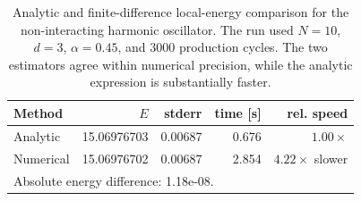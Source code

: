 \begin{table}[t]
\centering
\caption{Analytic and finite-difference local-energy comparison for the non-interacting harmonic oscillator. The run used $N=10$, $d=3$, $\alpha=0.45$, and 3000 production cycles. The two estimators agree within numerical precision, while the analytic expression is substantially faster.}
\label{tab:1b-timing}
\begin{tabular}{lrrrr}
\toprule
Method & $E$ & stderr & time [s] & rel. speed \\
\midrule
Analytic & 15.06976703 & 0.00687 & 0.676 & $1.00\times$ \\
Numerical & 15.06976702 & 0.00687 & 2.854 & $4.22\times$ slower \\
\bottomrule
\multicolumn{5}{l}{\footnotesize Absolute energy difference: 1.18e-08.}\\
\end{tabular}
\end{table}
